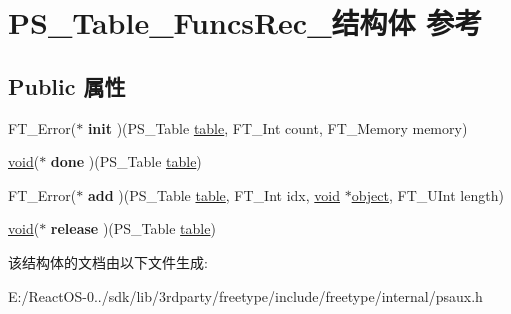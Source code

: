 \hypertarget{struct_p_s___table___funcs_rec__}{}\section{P\+S\+\_\+\+Table\+\_\+\+Funcs\+Rec\+\_\+结构体 参考}
\label{struct_p_s___table___funcs_rec__}
\subsection*{Public 属性}
\begin{DoxyCompactItemize}
\item 
\mbox{\label{struct_p_s___table___funcs_rec___a5ac6b9ff3cb3bec352235cecea5c6def}} 
F\+T\+\_\+\+Error($\ast$ {\bfseries init} )(P\+S\+\_\+\+Table \hyperlink{structtable}{table}, F\+T\+\_\+\+Int count, F\+T\+\_\+\+Memory memory)
\item 
\mbox{\label{struct_p_s___table___funcs_rec___ae358c8c8f5ae26f58c136993ddac6276}} 
\hyperlink{interfacevoid}{void}($\ast$ {\bfseries done} )(P\+S\+\_\+\+Table \hyperlink{structtable}{table})
\item 
\mbox{\label{struct_p_s___table___funcs_rec___a24dfeaaf0cec2115c186ea4f2a9cc4aa}} 
F\+T\+\_\+\+Error($\ast$ {\bfseries add} )(P\+S\+\_\+\+Table \hyperlink{structtable}{table}, F\+T\+\_\+\+Int idx, \hyperlink{interfacevoid}{void} $\ast$\hyperlink{structobject}{object}, F\+T\+\_\+\+U\+Int length)
\item 
\mbox{\label{struct_p_s___table___funcs_rec___aa593cc617f0caf908d7d7f3dd770fab5}} 
\hyperlink{interfacevoid}{void}($\ast$ {\bfseries release} )(P\+S\+\_\+\+Table \hyperlink{structtable}{table})
\end{DoxyCompactItemize}


该结构体的文档由以下文件生成\+:\begin{DoxyCompactItemize}
\item 
E\+:/\+React\+O\+S-\/0../sdk/lib/3rdparty/freetype/include/freetype/internal/psaux.\+h\end{DoxyCompactItemize}
